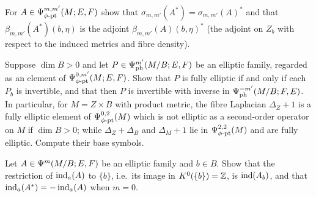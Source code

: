 \begin{exercise}\label{product:ex:adjoint}
For $A\in\Psi^{m,m'}_{\phi\text{-}\mathrm{pt}}(M;E,F)$ show that $\sigma_{m,m'}(A^*)=\sigma_{m,m'}(A)^*$
and that $\beta_{m,m'}(A^*)(b,\eta)$ is the adjoint $\beta_{m,m'}(A)(b,\eta)^*$ (the adjoint on $Z_b$ with respect
to the induced metrics and fibre density).
\end{exercise}

\begin{exercise}\label{product:ex:fibre-invertible}
Suppose $\dim B>0$ and let $P\in\Psi^{m'}_{\mathrm{ph}}(M/B;E,F)$ be an elliptic
family, regarded as an element of $\Psi^{0,m'}_{\phi\text{-}\mathrm{pt}}(M;E,F)$. Show that $P$ is fully
elliptic if and only if each $P_b$ is invertible, and that then $P$ is invertible
with inverse in $\Psi^{-m'}_{\mathrm{ph}}(M/B;F,E)$. In particular, for $M=Z\times B$ with product metric, the
fibre Laplacian $\Delta_Z+1$ is a fully elliptic element of $\Psi^{0,2}_{\phi\text{-}\mathrm{pt}}(M)$ which
is not elliptic as a second-order operator on $M$ if $\dim B>0$; while $\Delta_Z+\Delta_B$ and
$\Delta_M+1$ lie in $\Psi^{2,2}_{\phi\text{-}\mathrm{pt}}(M)$ and are fully elliptic. Compute their base
symbols.
\end{exercise}

\begin{exercise}\label{product:ex:index-pt}
Let $A\in\Psi^{m}(M/B;E,F)$ be an elliptic family and $b\in B$. Show that the
restriction of $\operatorname{ind}_a(A)$ to $\{b\}$, i.e.\ its image in $K^0(\{b\})=\mathbb{Z}$, is
$\operatorname{ind}(A_b)$, and that $\operatorname{ind}_a(A^*)=-\operatorname{ind}_a(A)$ when $m=0$.
\end{exercise}

